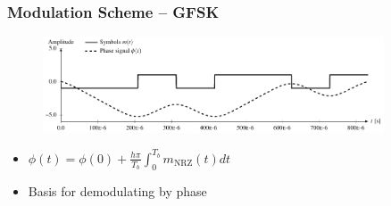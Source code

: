 \begin{frame} \frametitle{Modulation Scheme -- GFSK}
\begin{figure}[htbp]
    \centering
    \includegraphics[width=0.9\textwidth]{img/gfsk_integration}
    \label{fig:gfsk_integration}
\end{figure}
\begin{itemize}
    \item $ \phi(t) = \phi(0) + \frac{h\pi}{T_b}\int_{0}^{T_b} m_{\text{NRZ}}(t)  dt$
    \item Basis for demodulating by phase
\end{itemize}
\end{frame}

